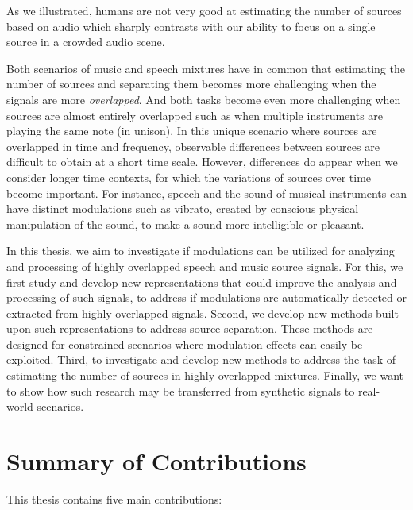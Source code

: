 As we illustrated, humans are not very good at estimating the number of sources based on audio which sharply contrasts with our ability to focus on a single source in a crowded audio scene.
\par
Both scenarios of music and speech mixtures have in common that estimating the number of sources and separating them becomes more challenging when the signals are more \emph{overlapped}.
And both tasks become even more challenging when sources are almost entirely overlapped such as when multiple instruments are playing the same note (in unison).
In this unique scenario where sources are overlapped in time and frequency,
observable differences between sources are difficult to obtain at a short time scale.
However, differences do appear when we consider longer time contexts, for which the variations of sources over time become important.
For instance, speech and the sound of musical instruments can have distinct modulations such as vibrato, created by conscious physical manipulation of the sound, to make a sound more intelligible or pleasant.
\par
In this thesis, we aim to investigate if modulations can be utilized for analyzing and processing of highly overlapped speech and music source signals.
For this, we first study and develop new representations that could improve the analysis and processing of such signals, to address if modulations are automatically detected or extracted from highly overlapped signals.
Second, we develop new methods built upon such representations to address source separation. 
These methods are designed for constrained scenarios where modulation effects can easily be exploited.
Third, to investigate and develop new methods to address the task of estimating the number of sources in highly overlapped mixtures.
Finally, we want to show how such research may be transferred from synthetic signals to real-world scenarios.

\section{Summary of Contributions}

This thesis contains five main contributions:

